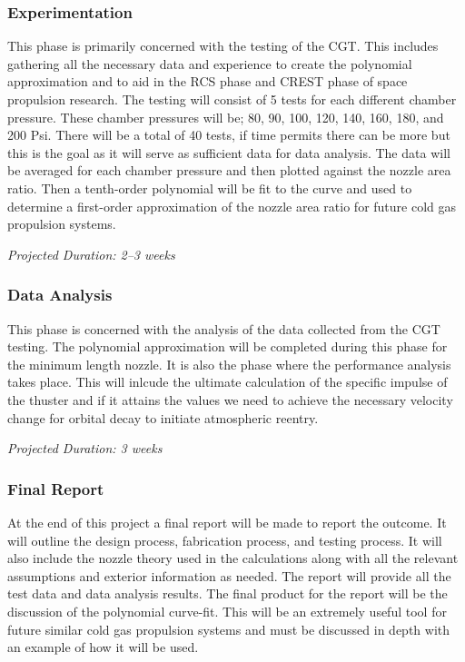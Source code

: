 \documentclass[conference]{IEEEtran} %
\begin{document}
\subsubsection{Experimentation}
\label{subsubsec:experimentation}
    This phase is primarily concerned with the testing of the CGT\@. This includes gathering all the necessary data and experience to create the
    polynomial approximation and to aid in the RCS phase and CREST phase of space propulsion research.
    The testing will consist of 5 tests for each different chamber pressure. These chamber pressures will be; 80, 90, 100, 120, 140, 160, 180, and 200 Psi. There
    will be a total of 40 tests, if time permits there can be more but this is the goal as it will serve as sufficient data for data analysis.
     The data will be averaged for each chamber pressure and then plotted against the nozzle area ratio. Then a tenth-order polynomial
    will be fit to the curve and used to determine a first-order approximation of the nozzle area ratio for future cold gas propulsion systems.

    \textit{Projected Duration: 2--3 weeks}

\subsubsection{Data Analysis}
\label{subsubsec: data analysis}
    This phase is concerned with the analysis of the data collected from the CGT testing. The polynomial approximation will be completed during this
    phase for the minimum length nozzle. It is also the phase where the performance analysis takes place. This will inlcude the ultimate calculation of the specific impulse
    of the thuster and if it attains the values we need to achieve the necessary velocity change for orbital decay to initiate atmospheric reentry.

    \textit{Projected Duration: 3 weeks}

\subsubsection{Final Report}
\label{subsubsec: final report}
    At the end of this project a final report will be made to report the outcome. It will outline the design process, fabrication process, and testing process.
    It will also include the nozzle theory used in the calculations along with all the relevant assumptions and exterior information as needed. The report will provide
    all the test data and data analysis results. The final product for the report will be the discussion of the polynomial curve-fit. This will be an extremely useful tool
    for future similar cold gas propulsion systems and must be discussed in depth with an example of how it will be used.
\end{document}
